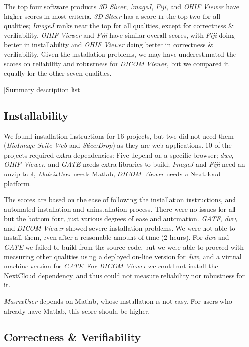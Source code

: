 \documentclass[final, 12pt, 3p, times]{elsarticle}
\begin{document}
The top four software products \textit{3D Slicer}, \textit{ImageJ},
\textit{Fiji}, and \textit{OHIF Viewer} have higher scores in most criteria.
\textit{3D Slicer} has a score in the top two for all qualities; \textit{ImageJ}
ranks near the top for all qualities, except for correctness \& verifiability.
\textit{OHIF Viewer} and \textit{Fiji} have similar overall scores, with
\textit{Fiji} doing better in installability and \textit{OHIF Viewer} doing
better in correctness \& verifiability.  Given the installation problems, we may
have underestimated the scores on reliability and robustness for \textit{DICOM
Viewer}, but we compared it equally for the other seven qualities.

[Summary description list]

\subsection{Installability} \label{sec_result_installability}

We found
installation instructions for 16 projects, but two did not need them
(\textit{BioImage Suite Web} and \textit{Slice:Drop})
as they are web applications. 10 of the projects required extra
dependencies: Five depend on a specific browser; \textit{dwv}, \textit{OHIF
Viewer}, and \textit{GATE} needs extra libraries to build; \textit{ImageJ} and
\textit{Fiji} need an unzip tool; \textit{MatrixUser} needs Matlab;
\textit{DICOM Viewer} needs a Nextcloud platform.

The scores are based on the ease of following the installation instructions,
and automated installation and uninstallation process. There were no issues
for all but the bottom four, just various degrees of ease and automation.
\textit{GATE}, \textit{dwv}, and \textit{DICOM Viewer} showed severe
installation problems. We were not able to install them, even after a reasonable
amount of time (2 hours).  For \textit{dwv} and \textit{GATE} we failed to build
from the source code, but we were able to proceed with measuring other qualities
using a deployed on-line version for \textit{dwv}, and a virtual machine version for
\textit{GATE}. For \textit{DICOM Viewer} we could not install the NextCloud
dependency, and thus could not measure reliability nor robustness for it.

\textit{MatrixUser} depends on Matlab, whose installation is not easy.
For users who already have Matlab, this score should be higher.

\subsection{Correctness \& Verifiability} \label{sec_result_correctness_verifiability}
\end{document}
